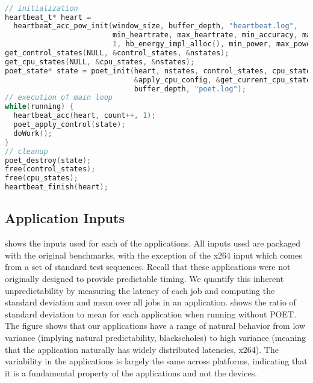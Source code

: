 %
\begin{lstlisting}[language=C,%
  caption={Example of POET application code.},%
  label={lst:poet-example}]%

// initialization
heartbeat_t* heart =
  heartbeat_acc_pow_init(window_size, buffer_depth, "heartbeat.log",
                         min_heartrate, max_heartrate, min_accuracy, max_accuracy,
                         1, hb_energy_impl_alloc(), min_power, max_power);
get_control_states(NULL, &control_states, &nstates);
get_cpu_states(NULL, &cpu_states, &nstates);
poet_state* state = poet_init(heart, nstates, control_states, cpu_states,
                              &apply_cpu_config, &get_current_cpu_state,
                              buffer_depth, "poet.log");
// execution of main loop
while(running) {
  heartbeat_acc(heart, count++, 1);
  poet_apply_control(state);
  doWork();
}
// cleanup
poet_destroy(state);
free(control_states);
free(cpu_states);
heartbeat_finish(heart);
\end{lstlisting}


\subsection{Application Inputs}
\label{sec:poet-inputs}


 shows the inputs used for each of the applications.
All inputs used are packaged with the original benchmarks, with the exception of the x264 input which comes from a set of standard test sequences.
Recall that these applications were not originally designed to provide predictable timing.
We quantify this inherent unpredictability by measuring the latency of each job and computing the standard deviation and mean over all jobs in an application.
 shows the ratio of standard deviation to mean for each application when running without POET.
The figure shows that our applications have a range of natural behavior from low variance (implying natural predictability, \eg blackscholes) to high variance (meaning that the application naturally has widely distributed latencies, \eg x264).
The variability in the applications is largely the same across platforms, indicating that it is a fundamental property of the applications and not the devices.

